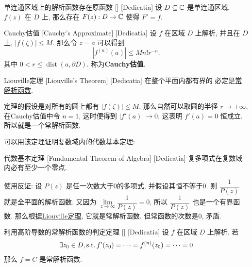         \begin{crl}
            {单连通区域上的解析函数存在原函数}
            []
            [Dedicatia]
            设 $D\subseteq\operatorname{\mathbb{C}}$ 是单连通区域, $f(z)$ 在 $D$ 上\Analytic{}, 那么存在 $F(z):D\to\operatorname{\mathbb{C}}$ 使得 $F'=f$.
        \end{crl}

        \begin{dfn}
            {Cauchy估值}
            [Cauchy's Approximate]
            [Dedicatia]
            设 $f$ 在区域 $D$ 上解析, 并且在 \(D\) 上, \(|f(\zeta)|\leqslant M\). 那么令 \(z=a\) 可以得到
            \[|f^{(n)}(a)|\leqslant Mn!r^{-n}.\]
            其中 $0<r\leq\operatorname{dist}(a,\partial D)$. 称为\textbf{Cauchy估值}.
        \end{dfn}

        \begin{thm}
            [Liouville]
            {Liouville定理}
            [Liouville's Theorem]
            [Dedicatia]
            在整个平面内都有界的\Analytic{} 必定是\hyperref[ppt:Trivial-Analytical-Function]{常解析函数}. 
        \end{thm}

        \begin{prf}
            定理的假设是对所有的圆上都有 \(|f(\zeta)|\leqslant M\). 那么自然可以取圆的半径 \(r\to+\infty \), 在Cauchy估值中令 \(n=1\), 这时便得到 \(|f'(a)|\to 0\). 这表明 \(f'(a)=0\) 恒成立. 所以就是一个常解析函数. 
        \end{prf}

        可以用该定理证明复数域内的代数基本定理: 

        \begin{thm}
            [FTOA]
            {代数基本定理}
            [Fundamental Theorem of Algebra]
            [Dedicatia]
            复多项式在复数域内必有至少一个零点. 
        \end{thm}

        \begin{prf}
            使用反证: 设 \(P(z)\) 是任一次数大于0的多项式, 并假设其恒不等于0. 则 \(\dfrac{1}{P(z)}\) 就是全平面的解析函数. 又因为 \(\lim\limits_{z\to\infty}\dfrac{1}{P(z)}=0\), 所以 \(\dfrac{1}{P(z)}\) 也是一个有界函数. 那么根据\hyperref[thm:Liouville]{Liouville定理}, 它就是常解析函数. 但常函数的次数是0, 矛盾. 
        \end{prf}

        \begin{thm}
            {利用高阶导数的常解析函数的判定定理}
            []
            [Dedicatia]
            设 $f$ 在区域 $D$ 上解析. 若 
            \[\exists z_0\in D, \operatorname{\text{s.t.}} f'(z_0)=\cdots=f^{(n)}(z_0)=\cdots=0  \]
            那么 $f=C$ 是常解析函数.
        \end{thm}

